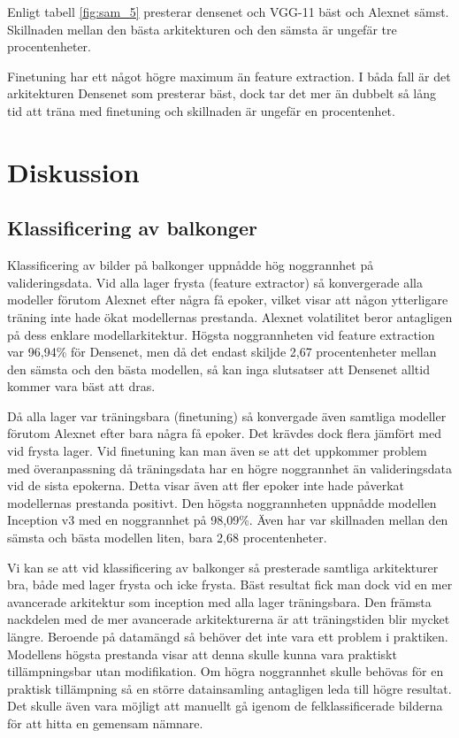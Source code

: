 \documentclass[]{kththesis}
\begin{document}
Enligt tabell \ref{fig:sam_5} presterar densenet och VGG-11 bäst och Alexnet sämst.
Skillnaden mellan den bästa arkitekturen och den sämsta är ungefär tre procentenheter.

Finetuning har ett något högre maximum än feature extraction.
I båda fall är det arkitekturen Densenet som presterar bäst, dock tar det mer än dubbelt så lång tid att träna med finetuning och skillnaden är ungefär en procentenhet.


\chapter{Diskussion}
\section{Klassificering av balkonger}
Klassificering av bilder på balkonger uppnådde hög noggrannhet på valideringsdata. Vid alla lager frysta (feature extractor) så konvergerade alla modeller förutom Alexnet efter några få epoker, vilket visar att någon ytterligare träning inte hade ökat modellernas prestanda. Alexnet volatilitet beror antagligen på dess enklare modellarkitektur. Högsta noggrannheten vid feature extraction var 96,94\% för Densenet, men då det endast skiljde 2,67 procentenheter mellan den sämsta och den bästa modellen, så kan inga slutsatser att Densenet alltid kommer vara bäst att dras.

Då alla lager var träningsbara (finetuning) så konvergade även samtliga modeller förutom Alexnet efter bara några få epoker. Det krävdes dock flera jämfört med vid frysta lager. Vid finetuning kan man även se att det uppkommer problem med överanpassning då träningsdata har en högre noggrannhet än valideringsdata vid de sista epokerna. Detta visar även att fler epoker inte hade påverkat modellernas prestanda positivt. Den högsta noggrannheten uppnådde modellen Inception v3 med en noggrannhet på 98,09\%. Även har var skillnaden mellan den sämsta och bästa modellen liten, bara 2,68 procentenheter.

Vi kan se att vid klassificering av balkonger så presterade samtliga arkitekturer bra, både med lager frysta och icke frysta. Bäst resultat fick man dock vid en mer avancerade arkitektur som inception med alla lager träningsbara. Den främsta nackdelen med de mer avancerade arkitekturerna är att träningstiden blir mycket längre. Beroende på datamängd så behöver det inte vara ett problem i praktiken. Modellens högsta prestanda visar att denna skulle kunna vara praktiskt tillämpningsbar utan modifikation. Om högra noggrannhet skulle behövas för en praktisk tillämpning så en större datainsamling antagligen leda till högre resultat. Det skulle även vara möjligt att manuellt gå igenom de felklassificerade bilderna för att hitta en gemensam nämnare.
\end{document}
